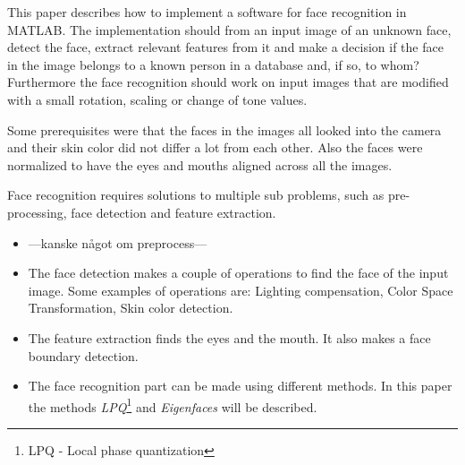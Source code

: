 This paper describes how to implement a software for face recognition in MATLAB. The implementation should from an input image of an unknown face, detect the face, extract relevant features from it and make a decision if the face in the image belongs to a known person in a database and, if so, to whom? Furthermore the face recognition should work on input images that are modified with a small rotation, scaling or change of tone values.

Some prerequisites were that the faces in the images all looked into the camera and their skin color did not differ a lot from each other. Also the faces were normalized to have the eyes and mouths aligned across all the images.

Face recognition requires solutions to multiple sub problems, such as pre-processing, face detection and feature extraction.

\begin{itemize}
  \item ---kanske något om preprocess---
  \item The face detection makes a couple of operations to find the face of the input image. Some examples of operations are: Lighting compensation, Color Space Transformation, Skin color detection.
  \item The feature extraction finds the eyes and the mouth. It also makes a face boundary detection.
  \item The face recognition part can be made using different methods. In this paper the methods \emph{LPQ}\footnote{LPQ - Local phase quantization} and \emph{Eigenfaces} will be described.
\end{itemize}

